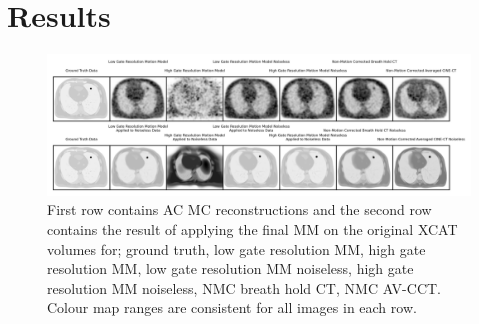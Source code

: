 \section{Results} \label{sec:results}
    \begin{figure}
        
        \centering
        
        \includegraphics[width=1.0\linewidth]{figures/visual_analysis.png}
        
        
        \captionsetup{singlelinecheck=false, justification=centering}
        \caption{First row contains \gls{AC} \gls{MC} reconstructions and the second row contains the result of applying the final \gls{MM} on the original \gls{XCAT} volumes for; ground truth, low gate resolution \gls{MM}, high gate resolution \gls{MM}, low gate resolution \gls{MM} noiseless, high gate resolution \gls{MM} noiseless, \gls{NMC} breath hold \gls{CT}, \gls{NMC} \gls{AV-CCT}. Colour map ranges are consistent for all images in each row.}
        
        \label{fig:visual_analysis}
        
    \end{figure}
    
